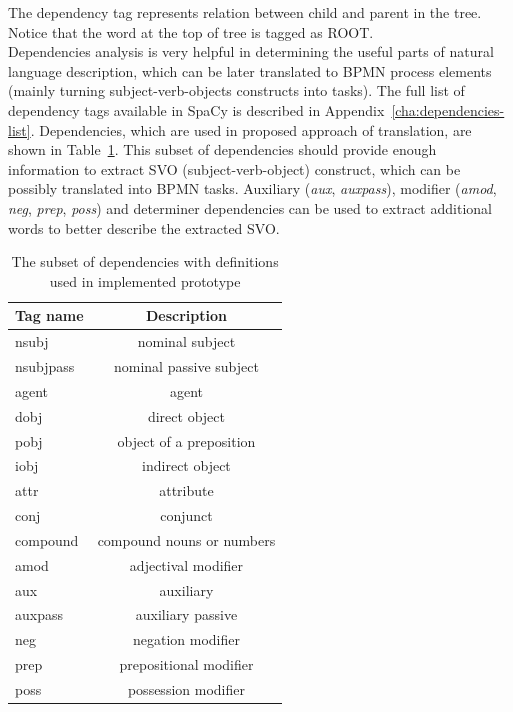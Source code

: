 The dependency tag represents relation between child and parent in the tree. Notice that the word at the top of tree is tagged as ROOT.\\
Dependencies analysis is very helpful in determining the useful parts of natural language description, which can be later translated to BPMN process elements (mainly turning subject-verb-objects constructs into tasks). The full list of dependency tags available in SpaCy is described in Appendix~\ref{cha:dependencies-list}. Dependencies, which are used in proposed approach of translation, are shown in Table~\ref{table:dependencies}. This subset of dependencies should provide enough information to extract SVO (subject-verb-object) construct, which can be possibly translated into BPMN tasks. Auxiliary (\emph{aux}, \emph{auxpass}), modifier (\emph{amod}, \emph{neg}, \emph{prep}, \emph{poss}) and determiner dependencies can be used to extract additional words to better describe the extracted SVO.
\begin{table}[ht]
	\begin{tabular}{|l|c|}
		\hline
		Tag name & Description\\
		\hline
		\hline
		nsubj & nominal subject\\
		\hline
		nsubjpass & nominal passive subject\\
		\hline
		agent & agent\\
		\hline
		dobj & direct object\\
		\hline
		pobj & object of a preposition\\
		\hline
		iobj & indirect object\\
		\hline
		attr & attribute\\
		\hline
		conj & conjunct\\
		\hline
		compound & compound nouns or numbers\\
		\hline
		amod & adjectival modifier\\
		\hline
		aux & auxiliary\\
		\hline
		auxpass & auxiliary passive\\
		\hline
		neg & negation modifier\\
		\hline
		prep & prepositional modifier\\
		\hline
		poss & possession modifier\\
		\hline
	\end{tabular}	
	\caption{The subset of dependencies with definitions used in implemented prototype}
	\label{table:dependencies}
\end{table}
